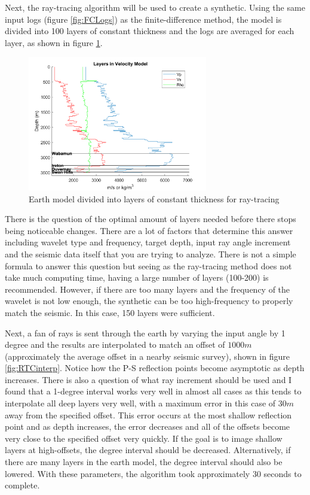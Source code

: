 \documentclass[12pt]{article}
\begin{document}
	Next, the ray-tracing algorithm will be used to create a synthetic. Using the same input logs (figure \ref{fig:FCLogs}) as the finite-difference method, the model is divided into 100 layers of constant thickness and the logs are averaged for each layer, as shown in figure \ref{fig:RTCLogs}. 

\begin{figure}[!htb]
	\centering
	\includegraphics[width=0.7\textwidth]{Figures/RTCLayers.png}
	\caption[Fox Creek ray-tracing layered model]{Earth model divided into layers of constant thickness for ray-tracing}
	\label{fig:RTCLogs}
\end{figure}

	There is the question of the optimal amount of layers needed before there stops being noticeable changes. There are a lot of factors that determine this answer including wavelet type and frequency, target depth, input ray angle increment and the seismic data itself that you are trying to analyze. There is not a simple formula to answer this question but seeing as the ray-tracing method does not take much computing time, having a large number of layers (100-200) is recommended. However, if there are too many layers and the frequency of the wavelet is not low enough, the synthetic can be too high-frequency to properly match the seismic. In this case, 150 layers were sufficient. 
	
\FloatBarrier

	Next, a fan of rays is sent through the earth by varying the input angle by 1 degree and the results are interpolated to match an offset of $1000m$ (approximately the average offset in a nearby seismic survey), shown in figure \ref{fig:RTCinterp}. Notice how the P-S reflection points become asymptotic as depth increases.  There is also a question of what ray increment should be used and I found that a 1-degree interval works very well in almost all cases as this tends to interpolate all deep layers very well, with a maximum error in this case of $30m$ away from the specified offset. This error occurs at the most shallow reflection point and as depth increases, the error decreases and all of the offsets become very close to the specified offset very quickly. If the goal is to image shallow layers at high-offsets, the degree interval should be decreased. Alternatively, if there are many layers in the earth model, the degree interval should also be lowered. With these parameters, the algorithm took approximately 30 seconds to complete. 
\end{document}
